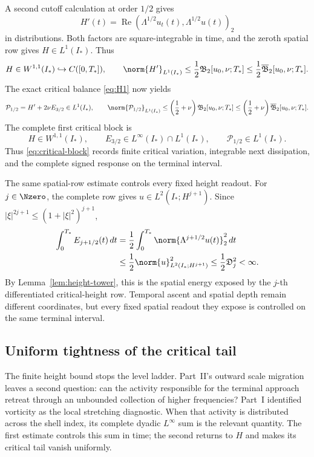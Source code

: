 A second cutoff calculation at order \(1/2\) gives
\[
 H'(t)=\operatorname{Re}
 (\Lambda^{1/2}u_t(t),\Lambda^{1/2}u(t))_2
\]
in distributions.  Both factors are square-integrable in time, and the
zeroth spatial row gives \(H\in L^1(I_*)\).  Thus
\begin{equation}
 H\in W^{1,1}(I_*)\hookrightarrow C([0,T_*]),
 \qquad
 \norm{H'}_{L^1(I_*)}
 \le\frac12\mathfrak B_2[u_0,\nu;T_*]
 \le\frac12\overline{\mathfrak B}_2[u_0,\nu;T_*].
 \label{eq:quantitative-critical-variation}
\end{equation}
The exact critical balance \eqref{eq:H1} now yields
\begin{equation}
 \mathcal P_{1/2}=H'+2\nu E_{3/2}\in L^1(I_*),
 \qquad
 \norm{\mathcal P_{1/2}}_{L^1(I_*)}
 \le\left(\frac12+\nu\right)\mathfrak B_2[u_0,\nu;T_*]
 \le\left(\frac12+\nu\right)
      \overline{\mathfrak B}_2[u_0,\nu;T_*].
 \label{eq:quantitative-critical-response}
\end{equation}
The complete first critical block is
\begin{equation}
 H\in W^{1,1}(I_*),
 \qquad
 E_{3/2}\in L^\infty(I_*)\cap L^1(I_*),
 \qquad
 \mathcal P_{1/2}\in L^1(I_*).
 \label{eq:critical-block}
\end{equation}
Thus \eqref{eq:critical-block} records finite critical variation, integrable
next dissipation, and the complete signed response on the terminal interval.

The same spatial-row estimate controls every fixed height readout.  For
\(j\in\Nzero\), the complete row gives
\(u\in L^2(I_*;H^{j+1})\).  Since
\(|\xi|^{2j+1}\le(1+|\xi|^2)^{j+1}\),
\begin{align*}
 \int_0^{T_*}E_{j+1/2}(t)\,dt
 &=\frac12\int_0^{T_*}
 \norm{\Lambda^{j+1/2}u(t)}_2^2\,dt
 \\
 &\le\frac12\norm{u}_{L^2(I_*;H^{j+1})}^2
 \le\frac12\mathfrak D_j^2<\infty.
\end{align*}
By Lemma~\ref{lem:height-tower}, this is the spatial energy exposed
by the \(j\)-th differentiated critical-height row.  Temporal ascent and
spatial depth remain different coordinates, but every fixed spatial readout
they expose is controlled on the same terminal interval.

\subsection{Uniform tightness of the critical tail}

The finite height bound stops the level ladder.  Part~II's outward scale
migration leaves a second question: can the activity responsible for the
terminal approach retreat through an unbounded collection of higher
frequencies?  Part~I identified vorticity as the local stretching diagnostic.
When that activity is distributed across the shell index, its complete dyadic
\(L^\infty\) sum is the relevant quantity.  The first estimate controls this
sum in time; the second returns to \(H\) and makes its critical tail vanish
uniformly.

